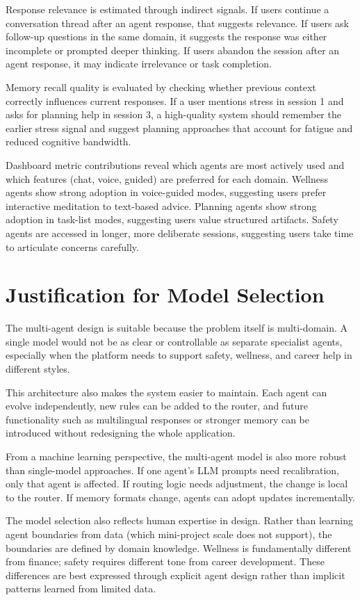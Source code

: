 \documentclass[oneside,a4paper,12pt]{report}
\begin{document}
Response relevance is estimated through indirect signals. If users continue a conversation thread after an agent response, that suggests relevance. If users ask follow-up questions in the same domain, it suggests the response was either incomplete or prompted deeper thinking. If users abandon the session after an agent response, it may indicate irrelevance or task completion.

Memory recall quality is evaluated by checking whether previous context correctly influences current responses. If a user mentions stress in session 1 and asks for planning help in session 3, a high-quality system should remember the earlier stress signal and suggest planning approaches that account for fatigue and reduced cognitive bandwidth.

Dashboard metric contributions reveal which agents are most actively used and which features (chat, voice, guided) are preferred for each domain. Wellness agents show strong adoption in voice-guided modes, suggesting users prefer interactive meditation to text-based advice. Planning agents show strong adoption in task-list modes, suggesting users value structured artifacts. Safety agents are accessed in longer, more deliberate sessions, suggesting users take time to articulate concerns carefully.

\section{Justification for Model Selection}
The multi-agent design is suitable because the problem itself is multi-domain. A single model would not be as clear or controllable as separate specialist agents, especially when the platform needs to support safety, wellness, and career help in different styles.

This architecture also makes the system easier to maintain. Each agent can evolve independently, new rules can be added to the router, and future functionality such as multilingual responses or stronger memory can be introduced without redesigning the whole application.

From a machine learning perspective, the multi-agent model is also more robust than single-model approaches. If one agent's LLM prompts need recalibration, only that agent is affected. If routing logic needs adjustment, the change is local to the router. If memory formats change, agents can adopt updates incrementally.

The model selection also reflects human expertise in design. Rather than learning agent boundaries from data (which mini-project scale does not support), the boundaries are defined by domain knowledge. Wellness is fundamentally different from finance; safety requires different tone from career development. These differences are best expressed through explicit agent design rather than implicit patterns learned from limited data.
\end{document}
